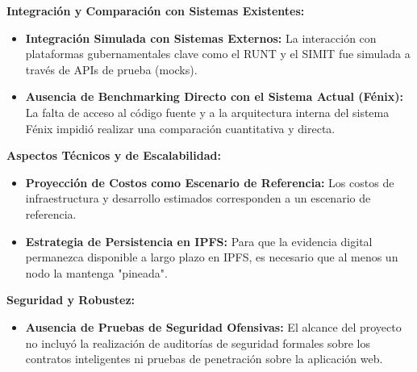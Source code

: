 \textbf{Integración y Comparación con Sistemas Existentes:}
\begin{itemize}
    \item \textbf{Integración Simulada con Sistemas Externos:} La interacción con plataformas gubernamentales clave como el RUNT y el SIMIT fue simulada a través de APIs de prueba (mocks).
    \item \textbf{Ausencia de Benchmarking Directo con el Sistema Actual (Fénix):} La falta de acceso al código fuente y a la arquitectura interna del sistema Fénix impidió realizar una comparación cuantitativa y directa.
\end{itemize}

\textbf{Aspectos Técnicos y de Escalabilidad:}
\begin{itemize}
    \item \textbf{Proyección de Costos como Escenario de Referencia:} Los costos de infraestructura y desarrollo estimados corresponden a un escenario de referencia.
    \item \textbf{Estrategia de Persistencia en IPFS:} Para que la evidencia digital permanezca disponible a largo plazo en IPFS, es necesario que al menos un nodo la mantenga "pineada".
\end{itemize}

\textbf{Seguridad y Robustez:}
\begin{itemize}
    \item \textbf{Ausencia de Pruebas de Seguridad Ofensivas:} El alcance del proyecto no incluyó la realización de auditorías de seguridad formales sobre los contratos inteligentes ni pruebas de penetración sobre la aplicación web.
\end{itemize} 